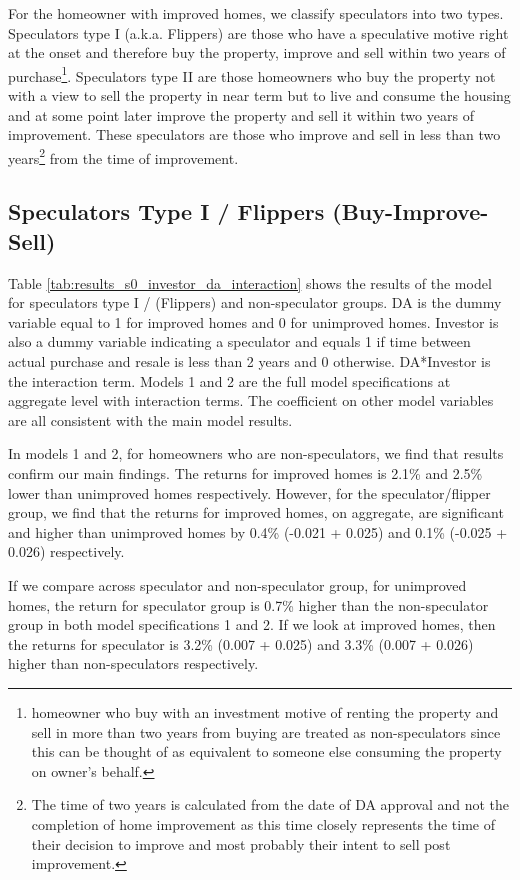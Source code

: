 \documentclass[AEJ,reqno, draftmode]{AEA} %
\begin{document}


For the homeowner with improved homes, we classify speculators into two types. Speculators type I (a.k.a. Flippers) are those who have a speculative motive right at the onset and therefore buy the property, improve and sell within two years of purchase\footnote{homeowner who buy with an investment motive of renting the property and sell in more than two years from buying are treated as non-speculators since this can be thought of as equivalent to someone else consuming the property on owner's behalf.}. Speculators type II are those homeowners who buy the property not with a view to sell the property in near term but to live and consume the housing and at some point later improve the property and sell it within two years of improvement. These speculators are those who improve and sell in less than two years\footnote{The time of two years is calculated from the date of DA approval and not the completion of home improvement as this time closely represents the time of their decision to improve and most probably their intent to sell post improvement.} from the time of improvement. 

\subsection{Speculators Type I / Flippers (Buy-Improve-Sell)}

Table \ref{tab:results_s0_investor_da_interaction} shows the results of the model for speculators type I / (Flippers) and non-speculator groups. DA is the dummy variable equal to 1 for improved homes and 0 for unimproved homes. Investor is also a dummy variable indicating a speculator and equals 1 if time between actual purchase and resale is less than 2 years and 0 otherwise. DA*Investor is the interaction term. Models 1 and 2 are the full model specifications at aggregate level with interaction terms. The coefficient on other model variables are all consistent with the main model results.

In models 1 and 2, for homeowners who are non-speculators, we find that results confirm our main findings. The returns for improved homes is 2.1\% and 2.5\% lower than unimproved homes respectively. However, for the speculator/flipper group, we find that the returns for improved homes, on aggregate, are significant and higher than unimproved homes by 0.4\% (-0.021 + 0.025) and 0.1\% (-0.025 + 0.026) respectively.

If we compare across speculator and non-speculator group, for unimproved homes, the return for speculator group is 0.7\% higher than the non-speculator group in both model specifications 1 and 2. If we look at improved homes, then the returns for speculator is 3.2\% (0.007 + 0.025) and 3.3\% (0.007 + 0.026) higher than non-speculators respectively.
\end{document}
